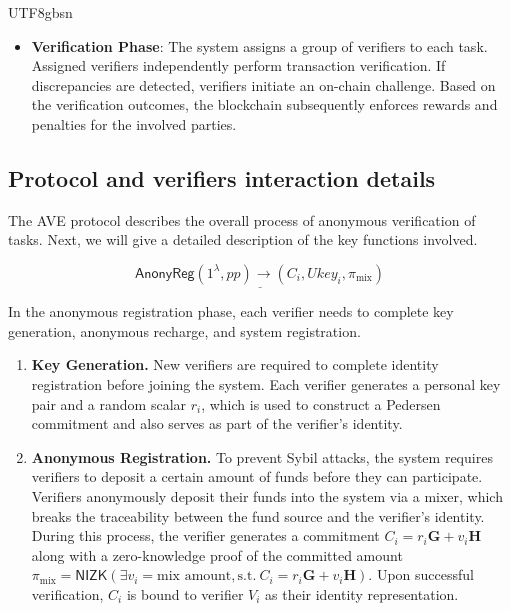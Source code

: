 \documentclass[runningheads]{llncs}
\newcommand{\nizk}{\mathsf{NIZK}}
\begin{document}
\begin{CJK*}{UTF8}{gbsn}
\begin{itemize}
    \item \textbf{Verification Phase}: The system assigns a group of verifiers to each task. Assigned verifiers independently perform transaction verification. If discrepancies are detected, verifiers initiate an on-chain challenge. Based on the verification outcomes, the blockchain subsequently enforces rewards and penalties for the involved parties.
\end{itemize}


\subsection{Protocol and verifiers interaction details}

The AVE protocol describes the overall process of anonymous verification of tasks. Next, we will give a detailed description of the key functions involved.

\vspace{-8pt}

\[
\underline{ \mathsf{AnonyReg}(1^\lambda, pp) \rightarrow (C_i, Ukey_i, \pi_{\text{mix}})  }
\]

In the anonymous registration phase, each verifier needs to complete key generation, anonymous recharge, and system registration.


\begin{enumerate}[label=(\arabic*)]

    \item \textbf{Key Generation.}  
    New verifiers are required to complete identity registration before joining the system. Each verifier generates a personal key pair and a random scalar $r_i$, which is used to construct a Pedersen commitment and also serves as part of the verifier’s identity.
    
    \item \textbf{Anonymous Registration.}  
    To prevent Sybil attacks, the system requires verifiers to deposit a certain amount of funds before they can participate. Verifiers anonymously deposit their funds into the system via a mixer, which breaks the traceability between the fund source and the verifier’s identity. During this process, the verifier generates a commitment $C_i = r_i \mathbf{G} + v_i \mathbf{H} $ along with a zero-knowledge proof of the committed amount $ \pi_\text{mix} = \nizk(\exists{v_i = \text{mix amount} },  \text{s.t.}\ C_i = r_i \mathbf{G} + v_i \mathbf{H} ) $. Upon successful verification, $C_i$ is bound to verifier $V_i$ as their identity representation.
    

\end{enumerate}
\end{CJK*}
\end{document}
